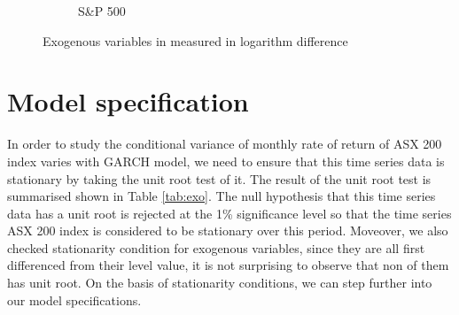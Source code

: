 \documentclass[11pt]{article}
\begin{document}
\begin{figure}
\begin{subfigure}[t]{0.31\textwidth}
	\caption{S\&P 500} \label{fig:ssp}
	\end{subfigure}	
	\caption{Exogenous variables in measured in logarithm difference}
\label{fig:exo}	
\end{figure}


\section{Model specification}
In order to study the conditional variance of monthly rate of return of ASX 200 index varies with GARCH model, we need to ensure that this time series data is stationary by taking the unit root test of it. The result of the unit root test is summarised shown in Table \ref{tab:exo}. The null hypothesis that this time series data has a unit root is rejected at the 1\% significance level so that the time series ASX 200 index is considered to be stationary over this period. 
Moveover, we also checked stationarity condition for exogenous variables, since they are all first differenced from their level value, it is not surprising to observe that non of them has unit root. 
On the basis of stationarity conditions, we can step further into our model specifications. 
\end{document}
